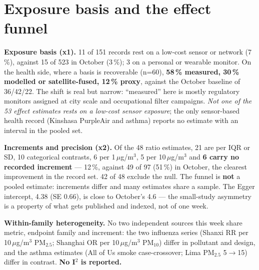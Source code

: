 \documentclass[10pt]{article}
\begin{document}
\vspace{4mm}

\par{}\baselineskip{}\baselineskip
\section*{\sffamily\bfseries\color{Deep}Exposure basis and the effect funnel}
\vspace{-1.5mm}{\color{Teal}\rule{\linewidth}{1.1pt}}\vspace{2.5mm}

\footnotesize
\textbf{Exposure basis (x1).} 11 of 151 records rest on a low-cost sensor or network (7\,\%), against 15 of 523 in
October (3\,\%); 3 on a personal or wearable monitor. On the health side, where a basis is recoverable (n=60),
\textbf{58\,\% measured, 30\,\% modelled or satellite-fused, 12\,\% proxy}, against the October baseline of 36/42/22.
The shift is real but narrow: ``measured'' here is mostly regulatory monitors assigned at city scale and occupational
filter campaigns. \emph{Not one of the 53 effect estimates rests on a low-cost sensor exposure}; the only sensor-based
health record (Kinshasa PurpleAir and asthma) reports no estimate with an interval in the pooled set.

\vspace{1.5mm}
\textbf{Increments and precision (x2).} Of the 48 ratio estimates, 21 are per IQR or SD, 10 categorical
contrasts, 6 per 1\,$\mu$g/m$^3$, 5 per 10\,$\mu$g/m$^3$ and \textbf{6 carry no recorded increment} --- 12\,\%,
against 49 of 97 (51\,\%) in October, the clearest improvement in the record set. 42 of 48 exclude the null. The
funnel is \textbf{not} a pooled estimate: increments differ and many estimates share a sample. The Egger intercept,
4.38 (SE 0.66), is close to October's 4.6 --- the small-study asymmetry is a property of what gets published and
indexed, not of one week.

\vspace{1.5mm}
\textbf{Within-family heterogeneity.} No two independent sources this week share metric, endpoint family and
increment: the two influenza series (Shanxi RR per 10\,$\mu$g/m$^3$ PM$_{2.5}$; Shanghai OR per 10\,$\mu$g/m$^3$
PM$_{10}$) differ in pollutant and design, and the asthma estimates (All of Us smoke case-crossover; Lima PM$_{2.5}$
5$\rightarrow$15) differ in contrast. \textbf{No I$^2$ is reported.}
\end{document}
